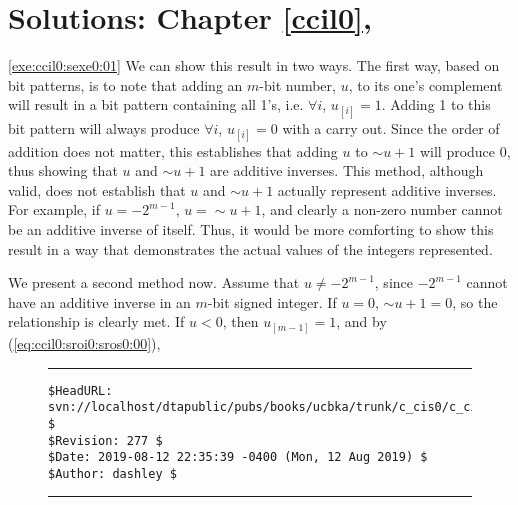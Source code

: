 
\chapter[Solutions: \ccilzeroxrefcomma{}Chapter \ref{ccil0}]
        {Solutions: \ccilzeroxrefcomma{}Chapter \ref{ccil0}, \ccilzerolongtitle{}}

\label{ccis0}

\vworkexercisechapterheader{}
\begin{vworkexercisesolution}{\ref{exe:ccil0:sexe0:01}}
We can show this result in two ways.  The first way, based on bit patterns, is to note
that adding an $m$-bit number, $u$, to its one's complement will result in a bit pattern
containing all 1's, i.e. $\forall i$, $u_{[i]} = 1$.  Adding 1 to this bit pattern will
always produce $\forall i$, $u_{[i]} = 0$ with a carry out.  Since the order of addition
does not matter, this establishes that adding $u$ to $\sim{}u+1$ will produce 0, thus showing
that $u$ and $\sim{}u+1$ are additive inverses.  This method, although valid, does not 
establish that $u$ and $\sim{}u+1$ actually represent additive inverses.  For example, if
$u=-2^{m-1}$, $u=\sim{}u+1$, and clearly a non-zero number cannot be an additive inverse of
itself.  Thus, it would be more comforting to show this result in a way that demonstrates the
actual values of the integers represented.

We present a second method now.  Assume that $u \neq -2^{m-1}$, since 
$-2^{m-1}$ cannot have an additive inverse in an $m$-bit signed integer.
If $u=0$, $\sim{}u+1=0$, so the relationship is clearly met.  If $u<0$, then
$u_{[m-1]}=1$, and by
(\ccilzeroxrefhyphen\ref{eq:ccil0:sroi0:sros0:00}),


\end{vworkexercisesolution}
\vworkexercisechapterfooter

\vfill
\noindent\begin{figure}[!b]
\noindent\rule[-0.25in]{\textwidth}{1pt}
\begin{tiny}
\begin{verbatim}
$HeadURL: svn://localhost/dtapublic/pubs/books/ucbka/trunk/c_cis0/c_cis0.tex $
$Revision: 277 $
$Date: 2019-08-12 22:35:39 -0400 (Mon, 12 Aug 2019) $
$Author: dashley $
\end{verbatim}
\end{tiny}
\noindent\rule[0.25in]{\textwidth}{1pt}
\end{figure}
%
